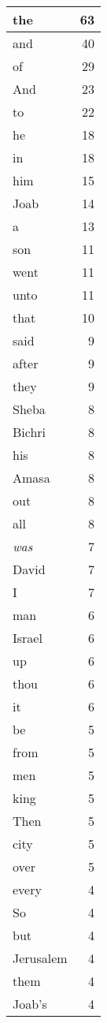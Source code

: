 \begin{center}
\begin{longtable}{l|r}
\hline \hline
\endlastfoot
the & 63 \\ \hline
and & 40 \\ \hline
of & 29 \\ \hline
And & 23 \\ \hline
to & 22 \\ \hline
he & 18 \\ \hline
in & 18 \\ \hline
him & 15 \\ \hline
Joab & 14 \\ \hline
a & 13 \\ \hline
son & 11 \\ \hline
went & 11 \\ \hline
unto & 11 \\ \hline
that & 10 \\ \hline
said & 9 \\ \hline
after & 9 \\ \hline
they & 9 \\ \hline
Sheba & 8 \\ \hline
Bichri & 8 \\ \hline
his & 8 \\ \hline
Amasa & 8 \\ \hline
out & 8 \\ \hline
all & 8 \\ \hline
\emph{was} & 7 \\ \hline
David & 7 \\ \hline
I & 7 \\ \hline
man & 6 \\ \hline
Israel & 6 \\ \hline
up & 6 \\ \hline
thou & 6 \\ \hline
it & 6 \\ \hline
be & 5 \\ \hline
from & 5 \\ \hline
men & 5 \\ \hline
king & 5 \\ \hline
Then & 5 \\ \hline
city & 5 \\ \hline
over & 5 \\ \hline
every & 4 \\ \hline
So & 4 \\ \hline
but & 4 \\ \hline
Jerusalem & 4 \\ \hline
them & 4 \\ \hline
Joab's & 4 \\ \hline

\end{longtable}
\end{center}
